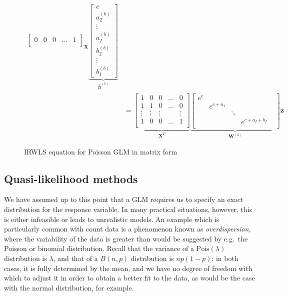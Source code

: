 \documentclass[a4paper]{book}
\begin{document}
\begin{figure}
\begin{displaymath}
\begin{split}
{\begin{bmatrix}
          0      & 0      & 0      & \dots & 1      \\
        \end{bmatrix}
      }_{\mathbf{X}}
      \underbrace{
        \begin{bmatrix}
          c \\ a^{(b)}_2 \\ \vdots \\ a^{(b)}_I \\ b^{(b)}_2 \\ \vdots \\ b^{(b)}_I
        \end{bmatrix}
      }_{\bm{\widehat{\beta}}^{(b)}} \\
      &=%
      \underbrace{
        \begin{bmatrix}
          1      & 0      & 0      & \dots & 0      \\
          1      & 1      & 0      & \dots & 0      \\
          \vdots & \vdots & \vdots &       & \vdots \\
          1      & 0      & 0      & \dots & 1      \\
        \end{bmatrix}
      }_{\mathbf{X}^T}
      \underbrace{
        \begin{bmatrix}
          e^{c} &             &        &                     \\
                & e^{c + a_1} &        &                   & \\
                &             & \ddots &                     \\
                &             &        & e^{c + a_I + b_I}   \\
        \end{bmatrix}
      }_{\mathbf{W}^{(k)}}
      \mathbf{z}
    \end{split}
  \end{displaymath}
  \caption{IRWLS equation for Poisson GLM in matrix form}
  \label{fig:glm-mat-eq}
\end{figure}

\subsection{Quasi-likelihood methods} \label{subsec:quasi}

We have assumed up to this point that a GLM requires us to specify an exact distribution for the response variable. In many practical situations, however, this is either infeasible or leads to unrealistic models. An example which is particularly common with count data is a phenomenon known as \emph{overdispersion}, where the variability of the data is greater than would be suggested by e.g.\ the Poisson or binomial distribution. Recall that the variance of a $\mathrm{Pois}(\lambda)$ distribution is $\lambda$, and that of a $B(n, p)$ distribution is $np(1 - p)$; in both cases, it is fully determined by the mean, and we have no degree of freedom with which to adjust it in order to obtain a better fit to the data, as would be the case with the normal distribution, for example.
\end{document}
